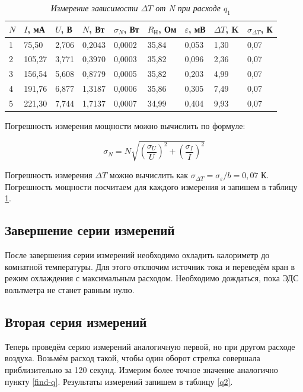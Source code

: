 \documentclass[a4paper,12pt]{article}
\begin{document}
\begin{table}[!ht]
    \centering
    \begin{tabular}{|l|l|l|l|l|l|l|l|l|}
    \hline
        $N$ & $I$, мА & $U$, В & $N$, Вт & $\sigma_N$, Вт & $R_\text{Н}$, Ом & $\varepsilon$, мВ & $\Delta T$, K & $\sigma_{\Delta T}$, К \\ \hline
        1 & 75,50 & 2,706 & 0,2043 & 0,0002 & 35,84 & 0,053 & 1,30 & 0,07 \\ \hline
        2 & 105,27 & 3,771 & 0,3970 & 0,0003 & 35,82 & 0,096 & 2,36 & 0,07 \\ \hline
        3 & 156,54 & 5,608 & 0,8779 & 0,0005 & 35,82 & 0,203 & 4,99 & 0,07 \\ \hline
        4 & 191,76 & 6,877 & 1,3187 & 0,0006 & 35,86 & 0,305 & 7,49 & 0,07 \\ \hline
        5 & 221,30 & 7,744 & 1,7137 & 0,0007 & 34,99 & 0,404 & 9,93 & 0,07 \\ \hline
    \end{tabular}\caption{\textit{Измерение зависимости $\Delta T$ от N при расходе $q_1$}}\label{deltaT-N-1}
\end{table}

Погрешность измерения мощности можно вычислить по формуле:

\begin{equation}\label{sigma-N}
    \sigma_N = N \sqrt{\left(\frac{\sigma_U}{U} \right)^ 2 + \left(\frac{\sigma_I}{I} \right)^ 2}
\end{equation}

Погрешность измерения $\Delta T$ можно вычислить как $\sigma_{\Delta T} = \sigma_\varepsilon / b = 0,07$ К. Погрешность мощности посчитаем для каждого измерения и запишем в таблицу \ref{deltaT-N-1}.

\subsection{Завершение серии измерений}

После завершения серии измерений необходимо охладить калориметр до комнатной температуры. Для этого отключим источник тока и  переведём кран в режим охлаждения с максимальным расходом. Необходимо дождаться, пока ЭДС вольтметра не станет равным нулю.

\subsection{Вторая серия измерений}

Теперь проведём серию измерений аналогичную первой, но при другом расходе воздуха. Возьмём расход такой, чтобы один оборот стрелка совершала приблизительно за 120 секунд. Измерим более точное значение аналогично пункту \ref{find-q}. Результаты измерений запишем в таблицу \ref{q2}.
\end{document}

